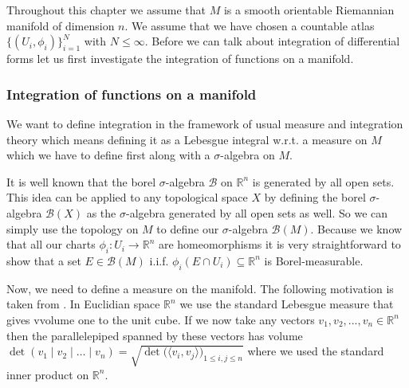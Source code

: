 \documentclass[12pt,a4paper]{article}
\numberwithin{equation}{subsection}
\numberwithin{lemma}{subsection}
\theoremstyle{definition}
\newcommand{\real}{\mathbb{R}}
\begin{document}
Throughout this chapter we assume that $M$ is a smooth orientable Riemannian 
manifold of dimension $n$. We assume that we have chosen a 
countable atlas $\{ (U_i, \phi_i) \}_{i=1}^N$ with $N \leq \infty$. 
Before we can talk about integration of differential forms let us first 
investigate the integration of functions on a manifold.

\subsubsection{Integration of functions on a manifold}

We want to define integration in the framework of usual measure and integration
theory which means defining it as a Lebesgue integral w.r.t. a measure on $M$
which we have to define first along with a $\sigma$-algebra on $M$. 

It is well known that
the borel $\sigma$-algebra $\mathcal{B}$ on $\real^n$ is generated
by all open sets. This idea can be applied to any topological space $X$ by 
defining the borel $\sigma$-algebra $\mathcal{B}(X)$ as the $\sigma$-algebra 
generated by all open sets as well. So we can simply use the topology on $M$ to define 
our $\sigma$-algebra $\mathcal{B}(M)$. Because we know that all our 
charts $\phi_i: U_i \rightarrow \real^n$ are homeomorphisms it is very 
straightforward to show that a set $E \in \mathcal{B}(M)$ i.i.f.
$\phi_i(E \cap U_i) \subseteq \real^n$ is Borel-measurable. 

Now, we need to define a measure on the manifold. 
The following motivation is taken from \cite[3.H.2]{gallot_hulin_lafontaine}.
In Euclidian space $\real^n$ we use the standard Lebesgue measure that gives 
vvolume one to the unit cube. If we now take any vectors $v_1, v_2, ..., v_n 
\in \real^n$ then the parallelepiped spanned by these vectors has 
volume $\det (v_1 \mid v_2 \mid \dots \mid v_n) 
= \sqrt{ \det \big( \langle v_i , v_j \rangle \big)_{1\leq i,j \leq n} }$ where 
we used the standard inner product on $\real^n$. 
\end{document}

